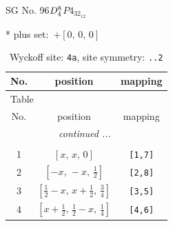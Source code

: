 \documentclass[fleqn,8pt]{jsarticle}
\begin{document}
\setcounter{MaxMatrixCols}{32}

\renewcommand{\tablename}{Table~}
\renewcommand{\figurename}{Figure~}
\begin{center}
\LARGE
SG No. 96\quad$D_{\rm 4}^{8}$\quad$P4_32_12$\quad[ tetragonal ]
\end{center}
* plus set:\,\,\,$+\left[ 0,\, 0,\, 0 \right]$
\renewcommand{\arraystretch}{1.2}
\begin{longtable}{ccc}
\caption{Wyckoff site: {\tt 4a}, site symmetry: {\tt ..2}}
 \\
 \hline \hline
No. & position & mapping \\ \hline \endfirsthead

\multicolumn{2}{l}{\tablename\ \thetable{}} \\
 \hline \hline
No. & position & mapping \\ \hline \endhead

 \hline \hline
\multicolumn{2}{r}{\footnotesize\it continued ...} \\ \endfoot

 \hline \hline
\multicolumn{2}{r}{} \\ \endlastfoot

1 & $\left[ x,\, x,\, 0 \right]$ & {\tt [1,7]} \\ \hline
2 & $\left[ - x,\, - x,\, \frac{1}{2} \right]$ & {\tt [2,8]} \\ \hline
3 & $\left[ \frac{1}{2} - x,\, x + \frac{1}{2},\, \frac{3}{4} \right]$ & {\tt [3,5]} \\ \hline
4 & $\left[ x + \frac{1}{2},\, \frac{1}{2} - x,\, \frac{1}{4} \right]$ & {\tt [4,6]} \\
\end{longtable}
\renewcommand{\arraystretch}{1.2}
\end{document}
